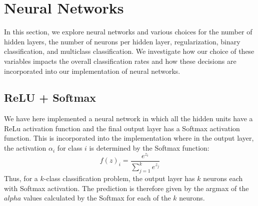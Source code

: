\documentclass{article}
\begin{document}

\section{Neural Networks}
In this section, we explore neural networks and various choices for the number of hidden layers, the number of neurons per hidden layer, regularization, binary classification, and multiclass classification. We investigate how our choice of these variables impacts the overall classification rates and how these decisions are incorporated into our implementation of neural networks.

\subsection{ReLU + Softmax}
We have here implemented a neural network in which all the hidden units have a ReLu activation function and the final output layer has a Softmax activation function. This is incorporated into the implementation where in the output layer, the activation $\alpha_i$ for class $i$ is determined by the Softmax function:
$$f(z)_i = \frac{e^{z_i}}{\sum_{j=1}^k e^{z_j}}$$
Thus, for a $k$-class classification problem, the output layer has $k$ neurons each with Softmax activation. The prediction is therefore given by the argmax of the $alpha$ values calculated by the Softmax for each of the $k$ neurons. \\
\end{document}
